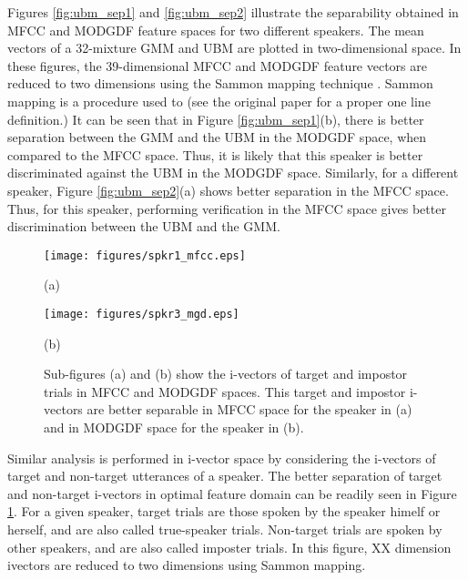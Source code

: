 \documentclass{article}
\begin{document}
Figures \ref{fig:ubm_sep1} and \ref{fig:ubm_sep2} illustrate the
separability obtained in MFCC and MODGDF feature spaces for two different
speakers. The mean vectors of a 32-mixture GMM and UBM are plotted in
two-dimensional space. In these figures, the 39-dimensional MFCC and MODGDF
feature vectors are reduced to two dimensions using the Sammon mapping technique
\cite{sammon}. Sammon mapping is a procedure used to (see the original paper for
a proper one line definition.)
It can be seen that in Figure \ref{fig:ubm_sep1}(b), there is
better separation between the GMM and the UBM in the MODGDF space, when compared
to the MFCC space. Thus, it is likely that this speaker is better discriminated
against the UBM in the MODGDF space. Similarly, for a different speaker, 
Figure \ref{fig:ubm_sep2}(a) shows better separation in the MFCC space. Thus,
for this speaker, performing verification in the MFCC space gives better
discrimination between the UBM and the GMM. 

\begin{figure}[h!tb]
\centering \hspace{-5cm}
\begin{minipage}{0.65\textwidth}
\centering 
\texttt{[image: figures/spkr1\_mfcc.eps]}
\caption*{(a)}
\label{fig:subfig3}
\end{minipage}%
\begin{minipage}{0.25\textwidth}
\centering \hspace{10cm}
\texttt{[image: figures/spkr3\_mgd.eps]}
\caption*{(b)}
\label{fig:subfig4}
\end{minipage}
\caption{Sub-figures (a) and (b) show the i-vectors of target and impostor
trials in MFCC and MODGDF spaces. This target and impostor i-vectors are better
separable in MFCC space for the speaker in (a) and in MODGDF space for the
speaker  in (b).}
\label{fig:ivec_separation}
\end{figure}

Similar analysis is performed in i-vector space by considering the i-vectors of
target and non-target utterances of a speaker. The better separation of target
and non-target i-vectors in optimal feature domain can be readily seen in 
Figure \ref{fig:ivec_separation}. For a given speaker, target trials are those
spoken by the speaker himelf or herself, and are also called true-speaker
trials. Non-target trials are spoken by other speakers, and are also called
imposter trials. In this figure, XX dimension ivectors are reduced to two dimensions using
Sammon mapping.
\end{document}
